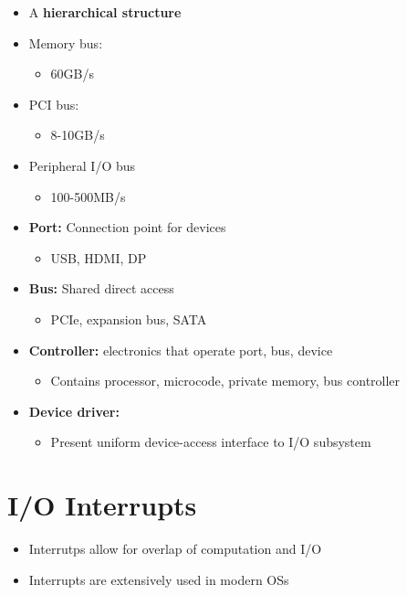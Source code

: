 \documentclass[a4paper,11pt,english]{article}
\begin{document}
\begin{itemize}
    \item A \textbf{\color{blue} hierarchical structure}
    \item Memory bus:
        \begin{itemize}
            \item 60GB/s
        \end{itemize}
    \item PCI bus:
        \begin{itemize}
            \item 8-10GB/s
        \end{itemize}
    \item Peripheral I/O bus
        \begin{itemize}
            \item 100-500MB/s
        \end{itemize}
    \item \textbf{\color{blue} Port:} Connection point for devices
        \begin{itemize}
            \item USB, HDMI, DP
        \end{itemize}
    \item \textbf{\color{blue} Bus:} Shared direct access
        \begin{itemize}
            \item PCIe, expansion bus, SATA 
        \end{itemize}
    \item \textbf{\color{blue} Controller:} electronics that operate port, bus, device
        \begin{itemize}
            \item Contains processor, microcode, private memory, bus controller 
        \end{itemize}
    \item \textbf{\color{blue} Device driver:}
        \begin{itemize}
            \item Present uniform device-access interface to I/O subsystem 
        \end{itemize}
\end{itemize}

\section*{I/O Interrupts}
\begin{itemize}
    \item Interrutps allow for overlap of computation and I/O
    \item Interrupts are extensively used in modern OSs 
\end{itemize}
\end{document}
